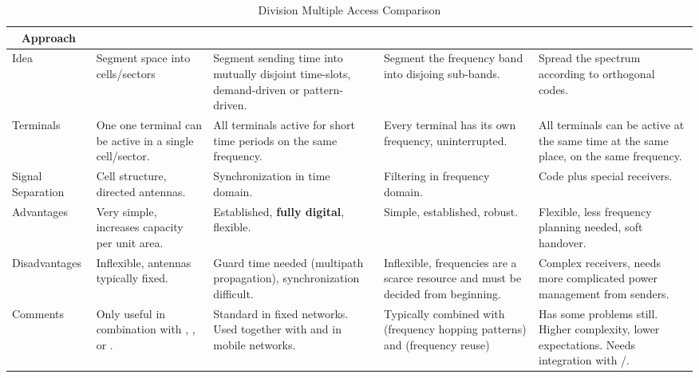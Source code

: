\begin{table}[h!]
  \centering
  \begin{tabular}{p{2cm}|p{3.6cm}p{3.6cm}p{3.6cm}p{3.6cm}}
    \toprule
    \multicolumn{1}{c|}{\textbf{Approach}} & \multicolumn{1}{c}{\textbf{\nameref{subsubsec:SDMA}}} & \multicolumn{1}{c}{\textbf{\nameref{subsubsec:TDMA}}} & \multicolumn{1}{c}{\textbf{\nameref{subsubsec:FDMA}}} & \multicolumn{1}{c}{\textbf{\nameref{subsubsec:CDMA}}} \\
    \midrule
    Idea & Segment space into cells/sectors & Segment sending time into mutually disjoint time-slots, demand-driven or pattern-driven. & Segment the frequency band into disjoing sub-bands. & Spread the spectrum according to orthogonal codes. \\ \midrule
    Terminals & One one terminal can be active in a single cell/sector. & All terminals active for short time periods on the same frequency. & Every terminal has its own frequency, uninterrupted. & All terminals can be active at the same time at the same place, on the same frequency. \\ \midrule
    Signal Separation & Cell structure, directed antennas. & Synchronization in time domain. & Filtering in frequency domain. & Code plus special receivers. \\ \midrule
    Advantages & Very simple, increases capacity per unit area. & Established, \textbf{fully digital}, flexible. & Simple, established, robust. & Flexible, less frequency planning needed, soft handover. \\ \midrule
    Disadvantages & Inflexible, antennas typically fixed. & Guard time needed (multipath propagation), synchronization difficult. & Inflexible, frequencies are a scarce resource and must be decided from beginning. & Complex receivers, needs more complicated power management from senders. \\ \midrule
    Comments & Only useful in combination with \nameref{subsubsec:TDMA}, \nameref{subsubsec:FDMA}, or \nameref{subsubsec:CDMA}. & Standard in fixed networks. Used together with \nameref{subsubsec:FDMA} and \nameref{subsubsec:SDMA} in mobile networks. & Typically combined with \nameref{subsubsec:TDMA} (frequency hopping patterns) and \nameref{subsubsec:SDMA} (frequency reuse) & Has some problems still. Higher complexity, lower expectations. Needs integration with \nameref{subsubsec:TDMA}/\nameref{subsubsec:FDMA}. \\
    \bottomrule
  \end{tabular}
  \caption{Division Multiple Access Comparison}
  \label{tab:DMA_Comparison}
\end{table}

